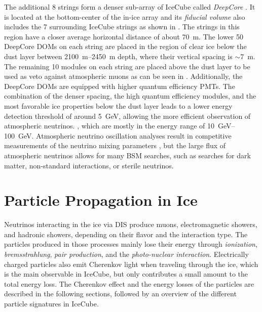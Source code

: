 The additional 8 strings form a denser sub-array of IceCube called \textit{DeepCore} . It is located at the bottom-center of the in-ice array and its \textit{fiducial volume} also includes the 7 surrounding IceCube strings as shown in . The strings in this region have a closer average horizontal distance of about \SI{70}{\meter}. The lower 50 DeepCore DOMs on each string are placed in the region of clear ice below the dust layer between \SIrange{2100}{2450}{\meter} depth, where their vertical spacing is $\sim$\SI{7}{\meter}. The remaining 10 modules on each string are placed above the dust layer to be used as veto against atmospheric muons as can be seen in . Additionally, the DeepCore DOMs are equipped with higher quantum efficiency PMTs. The combination of the denser spacing, the high quantum efficiency modules, and the most favorable ice properties below the dust layer leads to a lower energy detection threshold of around \SI{5}{GeV}, allowing the more efficient observation of atmospheric neutrinos.
, which are mostly in the energy range of \SIrange[range-phrase={~-~}]{10}{100}{\giga\electronvolt}.
Atmospheric neutrino oscillation analyses result in competitive measurements of the neutrino mixing parameters , but the large flux of atmospheric neutrinos allows for many BSM searches, such as searches for dark matter, non-standard interactions, or sterile neutrinos.


\section{Particle Propagation in Ice} 

Neutrinos interacting in the ice via DIS produce muons, electromagnetic showers, and hadronic showers, depending on their flavor and the interaction type. The particles produced in those processes mainly lose their energy through \textit{ionization}, \textit{bremsstrahlung}, \textit{pair production}, and the \textit{photo-nuclear interaction}. Electrically charged particles also emit Cherenkov light when traveling through the ice, which is the main observable in IceCube, but only contributes a small amount to the total energy loss. The Cherenkov effect and the energy losses of the particles are described in the following sections, followed by an overview of the different particle signatures in IceCube.


